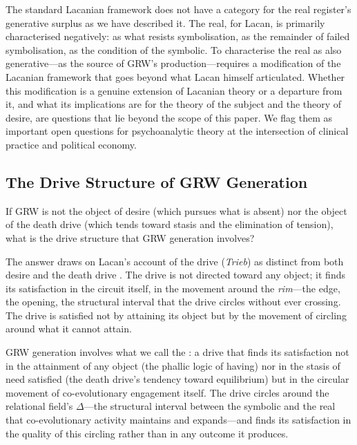 \begin{openquestion}
The standard Lacanian framework does not have a category for the real register's generative surplus as we have described it. The real, for Lacan, is primarily characterised negatively: as what resists symbolisation, as the remainder of failed symbolisation, as the condition of the symbolic. To characterise the real as also generative---as the source of GRW's production---requires a modification of the Lacanian framework that goes beyond what Lacan himself articulated. Whether this modification is a genuine extension of Lacanian theory or a departure from it, and what its implications are for the theory of the subject and the theory of desire, are questions that lie beyond the scope of this paper. We flag them as important open questions for psychoanalytic theory at the intersection of clinical practice and political economy.
\end{openquestion}

\subsection{The Drive Structure of GRW Generation}
\label{p15:subsec:drive}

\noindent
If GRW is not the object of desire (which pursues what is absent) nor the object of the death drive (which tends toward stasis and the elimination of tension), what is the drive structure that GRW generation involves?

The answer draws on Lacan's account of the drive (\emph{Trieb}) as distinct from both desire and the death drive \parencite{lacan2006}. The drive is not directed toward any object; it finds its satisfaction in the circuit itself, in the movement around the \emph{rim}---the edge, the opening, the structural interval that the drive circles without ever crossing. The drive is satisfied not by attaining its object but by the movement of circling around what it cannot attain.

GRW generation involves what we call the : a drive that finds its satisfaction not in the attainment of any object (the phallic logic of having) nor in the stasis of need satisfied (the death drive's tendency toward equilibrium) but in the circular movement of co-evolutionary engagement itself. The drive circles around the relational field's $\Delta$---the structural interval between the symbolic and the real that co-evolutionary activity maintains and expands---and finds its satisfaction in the quality of this circling rather than in any outcome it produces.

